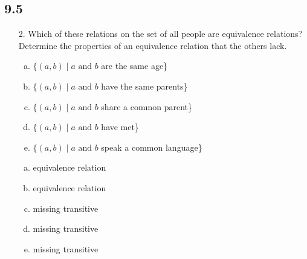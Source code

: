 \subsection{9.5}
\begin{itemize}
    \item[2.]  Which of these relations on the set of all people are equivalence relations? Determine the properties of an equivalence relation that the others lack.
          \begin{enumerate}[a.]
              \item $\{(a, b) \mid a \text{ and } b$ are the same age\}
              \item $\{(a, b) \mid a \text{ and } b$ have the same parents\}
              \item $\{(a, b) \mid a \text{ and } b$ share a common parent\}
              \item $\{(a, b) \mid a \text{ and } b$ have met\}
              \item $\{(a, b) \mid a \text{ and } b$ speak a common language\}
          \end{enumerate}
          \answer
          \begin{enumerate}[a.]
              \item equivalence relation
              \item equivalence relation
              \item missing transitive
              \item missing transitive
              \item missing transitive
          \end{enumerate}

\end{itemize}
